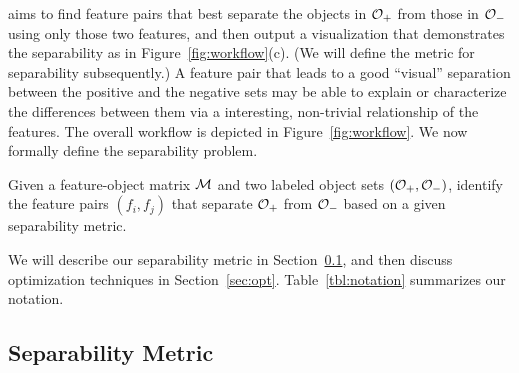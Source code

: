 \genviz aims to find feature pairs that
best separate the objects
in ${\mathcal{O}}_+$ from those in ${\mathcal{O}}_-$ using only those two features,
and then output a visualization that demonstrates the separability
as in Figure~\ref{fig:workflow}(c).
(We will define the metric for separability subsequently.)
A feature pair that leads to a good ``visual'' separation
between the positive and the negative sets may be able
to explain or characterize the differences between them
via a interesting,
non-trivial relationship of the features.
The overall workflow is depicted in Figure~\ref{fig:workflow}.
We now formally define the separability problem.
\begin{formulation}[Separability]\label{prob:separability}
Given a feature-object matrix ${\mathcal{M}}$ and two labeled object sets $({\mathcal{O}}_+,{\mathcal{O}}_-)$, identify the \topk feature pairs $(f_i,f_j)$ that separate ${\mathcal{O}}_+$ from ${\mathcal{O}}_-$ based on a given separability metric.
\end{formulation}
\noindent %
We will describe our separability metric in Section~\ref{sec:metric}, and then discuss optimization techniques in Section~\ref{sec:opt}. Table~\ref{tbl:notation} summarizes our notation.



\subsection{Separability Metric}\label{sec:metric}

